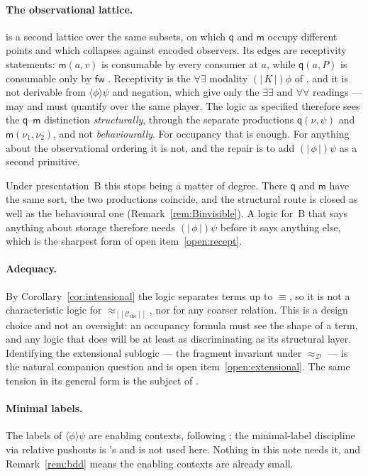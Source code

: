 \documentclass[11pt]{article}
\theoremstyle{plain}
\theoremstyle{definition}
\theoremstyle{remark}
\newcommand{\enc}[1]{[\![#1]\!]}
\newcommand{\Ctx}{\mathscr{C}}
\newcommand{\Obs}{\mathcal{D}}
\newcommand{\bisim}{\approx}
\newcommand{\mm}{\mathsf{m}}
\newcommand{\fw}{\mathsf{fw}}
\newcommand{\qq}{\mathsf{q}}
\newcommand{\scong}{\equiv}
\newcommand{\may}[1]{\langle #1 \rangle}
\newcommand{\rcp}[1]{(\!|\, #1 \,|\!)}
\begin{document}
\paragraph{The observational lattice.} \cite[Fig.~1]{rhocomb3} is a second
lattice over the same subsets, on which $\qq$ and $\mm$ occupy different points
and which collapses against encoded observers. Its edges are receptivity
statements: $\mm(a,v)$ is consumable by every consumer at $a$, while $\qq(a,P)$
is consumable only by $\fw$ \cite[Rem.~3.7]{rhocomb3}. Receptivity is the
$\forall\exists$ modality $\rcp{K}\phi$ of \cite[\S7]{softwhere}, and it is not
derivable from $\may{\phi}\psi$ and negation, which give only the
$\exists\exists$ and $\forall\forall$ readings --- may and must quantify over
the same player. The logic as specified therefore sees the $\qq$--$\mm$
distinction \emph{structurally}, through the separate productions
$\qq(\nu,\psi)$ and $\mm(\nu_1,\nu_2)$, and not \emph{behaviourally}. For
occupancy that is enough. For anything about the observational ordering it is
not, and the repair is to add $\rcp{\phi}\psi$ as a second primitive.

Under presentation~B this stops being a matter of degree. There $\qq$ and
$\mm$ have the same sort, the two productions coincide, and the structural
route is closed as well as the behavioural one
(Remark~\ref{rem:Binvisible}). A logic for~B that says anything about storage
therefore needs $\rcp{\phi}\psi$ before it says anything else, which is the
sharpest form of open item~\ref{open:recept}.

\paragraph{Adequacy.} By Corollary~\ref{cor:intensional} the logic separates
terms up to $\scong$, so it is not a characteristic logic for
$\bisim_{\enc{\Ctx_{\mathrm{rho}}}}$, nor for any coarser relation. This is a
design choice and not an oversight: an occupancy formula must see the shape of
a term, and any logic that does will be at least as discriminating as its
structural layer. Identifying the extensional sublogic --- the fragment
invariant under $\bisim_{\Obs}$ --- is the natural companion question and is
open item~\ref{open:extensional}. The same tension in its general form is the
subject of \cite{extnote}.

\paragraph{Minimal labels.} The labels of $\may{\phi}\psi$ are enabling
contexts, following \cite[\S5]{rhocomb3}; the minimal-label discipline via
relative pushouts is \cite{bihol}'s and is not used here. Nothing in this note
needs it, and Remark~\ref{rem:bdd} means the enabling contexts are already
small.
\end{document}
